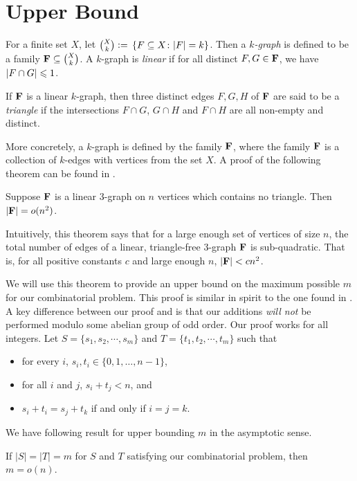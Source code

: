 \section{Upper Bound}\label{sec:upper-bound}

\begin{definition}
	For a finite set $X$, let $\binom{X}{k} {\;\vcentcolon=\;}\left\lbrace F\subseteq X\colon |F| = k \right\rbrace$. Then a {\em $k$-graph} is defined to be a family ${\mathbf F}\subseteq \binom{X}{k}$.
	A $k$-graph is {\em linear} if for all distinct $F,G \in {\mathbf F}$, we have $|F\cap G| \leqslant 1$.
\end{definition}
\begin{definition}
	If ${\mathbf F}$ is a linear $k$-graph, then three distinct edges $F,G,H$ of ${\mathbf F}$ are said to be a {\em triangle} if the intersections $F\cap G$, $G\cap H$ and $F\cap H$ are all non-empty and distinct.
\end{definition}

More concretely, a $k$-graph is defined by the family ${\mathbf F}$, where the family ${\mathbf F}$ is a collection of $k$-edges with vertices from the set $X$. A proof of the following theorem can be found in \cite{EFR86}.
\begin{theorem} 
	\label{thm:RS}
	Suppose $ {\mathbf F} $ is a linear 3-graph on $ n $ vertices which contains no triangle. Then $ \left\vert{\ensuremath{{\mathbf F}}}\right\vert = o(n^2) $. 
\end{theorem}

Intuitively, this theorem says that for a large enough set of vertices of size $n$, the total number of edges of a linear, triangle-free 3-graph ${\mathbf F}$ is sub-quadratic. That is, for all positive constants $c$ and large enough $n$, $|{\mathbf F}| < cn^2$.

We will use this theorem to provide an upper bound on the maximum possible $m$ for our combinatorial problem. This proof is similar in spirit to the one found in \cite{FGV87}. A key difference between our proof and \cite{FGV87} is that our additions {\em will not} be performed modulo some abelian group of odd order. Our proof works for all integers. Let $ S = \{s_1, s_2, \cdots, s_m\} $ and $ T =\{ t_1,t_2, \cdots, t_m\} $ such that 
\begin{itemize}
	\item for every $ i $, $ s_i, t_i \in \{0,1,\dotsc, n-1\} $,
	\item for all $i$ and $j$, $s_i + t_j < n$, and
	\item $ s_i + t_i = s_j + t_k $  if and only if $ i = j = k $.
\end{itemize}
We have following result for upper bounding $ m $ in the asymptotic sense. 
\begin{theorem}
	If $|S| = |T| = m$ for $S$ and $T$ satisfying our combinatorial problem, then $ m = o(n) $.
\end{theorem}  

